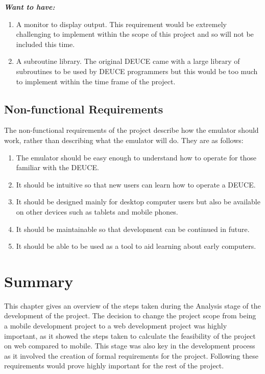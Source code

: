 \documentclass{l4proj}
\begin{document}
\textbf{\textit{Want to have:}}
\begin{enumerate}
	\item A monitor to display output. This requirement would be extremely challenging to implement within the scope of this project and so will not be included this time.
	\item A subroutine library. The original DEUCE came with a large library of subroutines to be used by DEUCE programmers but this would be too much to implement within the time frame of the project.
\end{enumerate}
\subsection{Non-functional Requirements}
The non-functional requirements of the project describe how the emulator should work, rather than describing what the emulator will do. They are as follows:
\begin{enumerate}
	\item The emulator should be easy enough to understand how to operate for those familiar with the DEUCE.
	\item It should be intuitive so that new users can learn how to operate a DEUCE.
	\item It should be designed mainly for desktop computer users but also be available on other devices such as tablets and mobile phones.
	\item It should be maintainable so that development can be continued in future.
	\item It should be able to be used as a tool to aid learning about early computers.
\end{enumerate}

\section{Summary}
This chapter gives an overview of the steps taken during the Analysis stage of the development of the project. The decision to change the project scope from being a mobile development project to a web development project was highly important, as it showed the steps taken to calculate the feasibility of the project on web compared to mobile. This stage was also key in the development process as it involved the creation of formal requirements for the project. Following these requirements would prove highly important for the rest of the project.

\end{document}
